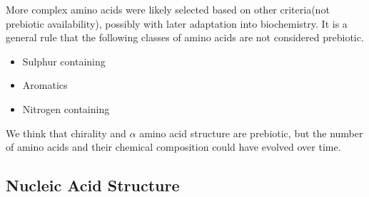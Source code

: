 \documentclass[]{article}
\begin{document}
More complex amino acids were likely selected based on other criteria(not prebiotic availability), possibly with later adaptation into biochemistry. It is a general rule that the following classes of amino acids are not considered prebiotic.

\begin{itemize}
	\item Sulphur containing
	\item Aromatics
	\item Nitrogen containing
\end{itemize}

We think that chirality and $\alpha$ amino acid structure are prebiotic, but the number of amino acids and their chemical composition could have evolved over time.

\subsection{Nucleic Acid Structure}
\end{document}
